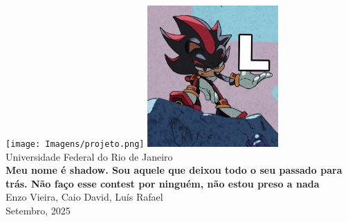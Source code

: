 \begin{titlepage}
    \pagestyle{empty}
	\begin{center}
		\strut %
		
		\texttt{[image: Imagens/projeto.png]}
		\includegraphics[width=5cm]{Imagens/ShadowL.jpg}\\[1cm]
		{\fontsize{25}{30}\selectfont Universidade Federal do Rio de Janeiro\\[0.8cm]}
		{\fontsize{40}{30}\selectfont \textbf{Meu nome é shadow. Sou aquele que deixou todo o seu passado para trás. Não faço esse contest por ninguém, não estou preso a nada}
\\[0.8cm]}
		{\LARGE Enzo Vieira, Caio David, Luís Rafael\\}
		\vfill
		\vspace{0.5cm}
		{\huge Setembro, 2025}\\
		\vspace{1cm}
    \end{center}
\end{titlepage}